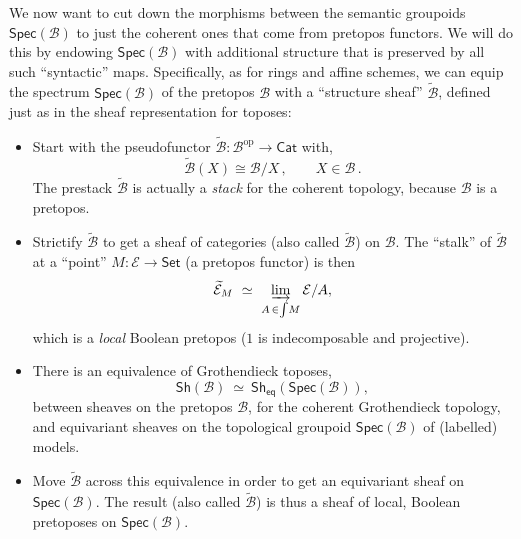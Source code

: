 \documentclass[graybox]{svmult}
\newcommand{\EE}{\ensuremath{\mathcal{E}}}
\newcommand{\BB}{\ensuremath{\mathcal{B}}}
\newcommand{\Set}{\ensuremath{\mathsf{Set}}}
\begin{document}
We now want to cut down the morphisms between the semantic groupoids $\mathsf{Spec}(\mathcal{B})$ to just the coherent ones that come from pretopos functors.  We will do this by endowing $\mathsf{Spec}(\mathcal{B})$ with additional structure that is preserved by all such ``syntactic'' maps.   Specifically, as for rings and affine schemes, we can equip the spectrum $\mathsf{Spec}(\mathcal{B})$ of the pretopos $\mathcal{B}$ with a ``structure sheaf'' $\widetilde{\mathcal{B}}$,  defined just as in the sheaf representation for toposes: 
\begin{itemize}
\item Start with the pseudofunctor $\widetilde{\mathcal{B}} : \mathcal{B}^{\mathrm{op}}\to\mathsf{Cat}$ with,
\[
\widetilde{\mathcal{B}}(X) \cong \mathcal{B}/X\,,\qquad X\in \BB\,.
\]
The prestack $\widetilde{\mathcal{B}}$ is actually a \emph{stack} for the coherent topology, because $\mathcal{B}$ is a pretopos.
 
\item Strictify $\widetilde{\BB}$ to get a sheaf of categories (also called $\widetilde{\mathcal{B}}$) on $\mathcal{B}$.  The ``stalk'' of $\widetilde{\mathcal{B}}$ at a ``point'' $M : \EE\to \Set$ (a pretopos functor) is then 
\[
\widetilde{\EE}_{M}\ \simeq\ \varinjlim_{A\,\in\int\!{M}}\EE/A, 
\]
which is a \emph{local} Boolean pretopos ($1$ is indecomposable and projective).

\item There is an equivalence of Grothendieck toposes,
\[
\mathsf{Sh}(\BB)\ \simeq\ \mathsf{Sh}_{\mathsf{eq}}(\mathsf{Spec}(\mathcal{B})),
\]
between sheaves on the pretopos $\BB$, for the coherent Grothendieck topology, and equivariant sheaves on the topological groupoid $\mathsf{Spec}(\mathcal{B})$ of (labelled) models. 

\item Move $\widetilde{\mathcal{B}}$ across this equivalence in order to get an equivariant sheaf on $\mathsf{Spec}(\mathcal{B})$.  The result (also called $\widetilde{\mathcal{B}}$) is thus a sheaf of local, Boolean pretoposes on $\mathsf{Spec}(\mathcal{B})$.  

\end{itemize}
\end{document}
